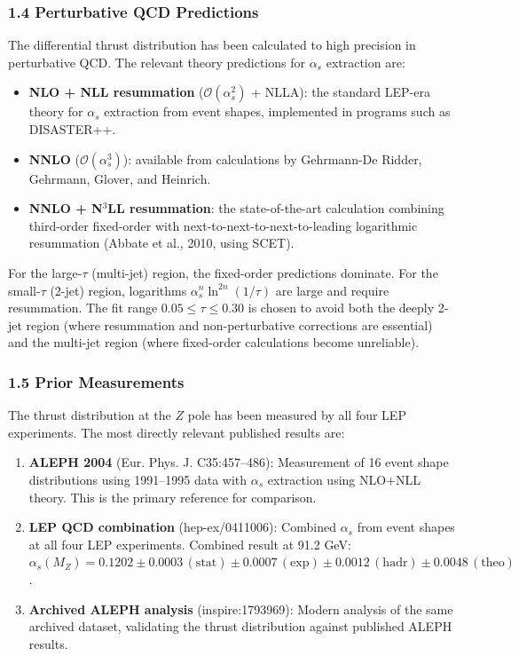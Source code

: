\documentclass[11pt,]{article}
\providecommand{\tightlist}{%
  \setlength{\itemsep}{0pt}\setlength{\parskip}{0pt}}
\begin{document}
\hypertarget{perturbative-qcd-predictions}{%
\subsubsection{1.4 Perturbative QCD
Predictions}\label{perturbative-qcd-predictions}}

The differential thrust distribution has been calculated to high
precision in perturbative QCD. The relevant theory predictions for
\(\alpha_s\) extraction are:

\begin{itemize}
\tightlist
\item
  \textbf{NLO + NLL resummation} (\(\mathcal{O}(\alpha_s^2)\) + NLLA):
  the standard LEP-era theory for \(\alpha_s\) extraction from event
  shapes, implemented in programs such as DISASTER++.
\item
  \textbf{NNLO} (\(\mathcal{O}(\alpha_s^3)\)): available from
  calculations by Gehrmann-De Ridder, Gehrmann, Glover, and Heinrich.
\item
  \textbf{NNLO + N\(^3\)LL resummation}: the state-of-the-art
  calculation combining third-order fixed-order with
  next-to-next-to-next-to-leading logarithmic resummation (Abbate et
  al., 2010, using SCET).
\end{itemize}

For the large-\(\tau\) (multi-jet) region, the fixed-order predictions
dominate. For the small-\(\tau\) (2-jet) region, logarithms
\(\alpha_s^n \ln^{2n}(1/\tau)\) are large and require resummation. The
fit range \(0.05 \leq \tau \leq 0.30\) is chosen to avoid both the
deeply 2-jet region (where resummation and non-perturbative corrections
are essential) and the multi-jet region (where fixed-order calculations
become unreliable).

\hypertarget{prior-measurements}{%
\subsubsection{1.5 Prior Measurements}\label{prior-measurements}}

The thrust distribution at the \(Z\) pole has been measured by all four
LEP experiments. The most directly relevant published results are:

\begin{enumerate}
\def\labelenumi{\arabic{enumi}.}
\item
  \textbf{ALEPH 2004} (Eur. Phys. J. C35:457--486): Measurement of 16
  event shape distributions using 1991--1995 data with \(\alpha_s\)
  extraction using NLO+NLL theory. This is the primary reference for
  comparison.
\item
  \textbf{LEP QCD combination} (hep-ex/0411006): Combined \(\alpha_s\)
  from event shapes at all four LEP experiments. Combined result at 91.2
  GeV:
  \(\alpha_s(M_Z) = 0.1202 \pm 0.0003\,(\text{stat}) \pm 0.0007\,(\text{exp}) \pm 0.0012\,(\text{hadr}) \pm 0.0048\,(\text{theo})\).
\item
  \textbf{Archived ALEPH analysis} (inspire:1793969): Modern analysis of
  the same archived dataset, validating the thrust distribution against
  published ALEPH results.
\end{enumerate}
\end{document}
